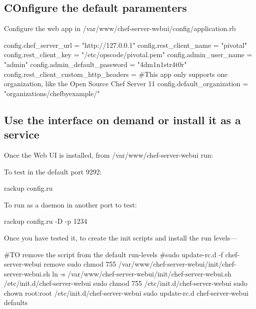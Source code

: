 \subsection{COnfigure the default paramenters}

Configure the web app in /var/www/chef-server-webui/config/application.rb

\begin{codelisting}
\label{code:}
\codecaption{}
\begin{code}
config.chef_server_url = "http://127.0.0.1"
config.rest_client_name = "pivotal"
config.rest_client_key = "/etc/opscode/pivotal.pem"
config.admin_user_name =  "admin"
config.admin_default_password = "4dm1n1str4t0r"
config.rest_client_custom_http_headers = {}
#This app only supports one organization, like the Open Source Chef Server 11
config.default_organization = "organizations/chefbyexample/"
\end{code}
\end{codelisting}

\subsection{Use the interface on demand or install it as a service}

Once the Web UI is installed, from /var/www/chef-server-webui run:

To test in the default port 9292:
\begin{codelisting}
\label{code:}
\codecaption{}
\begin{code}
rackup config.ru
\end{code}
\end{codelisting}

To run as a daemon in another port to test:
\begin{codelisting}
\label{code:}
\codecaption{}
\begin{code}
rackup config.ru -D -p 1234
\end{code}
\end{codelisting}

Once you have tested it, to create the init scripts and install the run levels---
\begin{codelisting}
\label{code:}
\codecaption{}
\begin{code}
#TO remove the script from the default run-levels
#sudo update-rc.d -f chef-server-webui remove
sudo chmod 755 /var/www/chef-server-webui/init/chef-server-webui.sh
ln -s /var/www/chef-server-webui/init/chef-server-webui.sh /etc/init.d/chef-server-webui
sudo chmod 755 /etc/init.d/chef-server-webui
sudo chown root:root /etc/init.d/chef-server-webui
sudo update-rc.d chef-server-webui defaults
\end{code}
\end{codelisting}